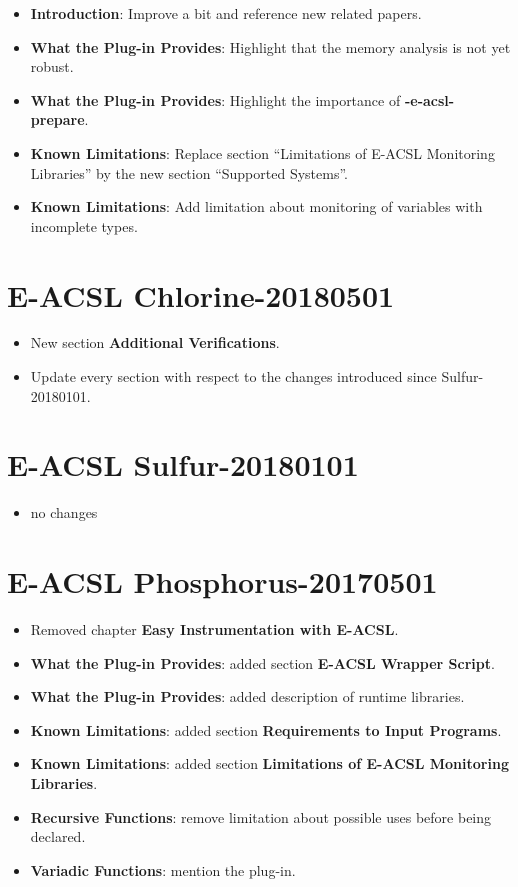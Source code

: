 \begin{itemize}
\item \textbf{Introduction}: Improve a bit and reference new related papers.
\item \textbf{What the Plug-in Provides}: Highlight that the memory analysis is
  not yet robust.
\item \textbf{What the Plug-in Provides}: Highlight the importance of
  \textbf{-e-acsl-prepare}.
\item \textbf{Known Limitations}: Replace section ``Limitations of E-ACSL
  Monitoring Libraries'' by the new section ``Supported Systems''.
\item \textbf{Known Limitations}: Add limitation about monitoring of variables
  with incomplete types.
\end{itemize}

\section*{E-ACSL Chlorine-20180501}

\begin{itemize}
\item New section \textbf{Additional Verifications}.
\item Update every section with respect to the changes introduced since \eacsl
  Sulfur-20180101.
\end{itemize}

\section*{E-ACSL Sulfur-20180101}

\begin{itemize}
\item no changes
\end{itemize}

\section*{E-ACSL Phosphorus-20170501}

\begin{itemize}
\item Removed chapter \textbf{Easy Instrumentation with E-ACSL}.
\item \textbf{What the Plug-in Provides}: added section \textbf{E-ACSL Wrapper
  Script}.
\item \textbf{What the Plug-in Provides}: added description of \eacsl runtime
  libraries.
\item \textbf{Known Limitations}: added section \textbf{Requirements to Input
  Programs}.
\item \textbf{Known Limitations}: added section \textbf{Limitations of E-ACSL Monitoring Libraries}.
\item \textbf{Recursive Functions}: remove limitation about possible uses before
  being declared.
\item \textbf{Variadic Functions}: mention the \variadic plug-in.
\end{itemize}

